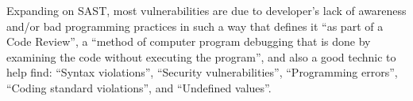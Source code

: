 



Expanding on SAST, most vulnerabilities are due to developer's lack of awareness and/or bad programming practices \cite{SAST_opensource} in such a way that \citeauthor{owasp-devsecops-sast} \cite{owasp-devsecops-sast} defines it ``as part of a Code Review'', a ``method of computer program debugging that is done by examining the code without executing the program'', and also a good technic to help find: ``Syntax violations'', ``Security vulnerabilities'', ``Programming errors'', ``Coding standard violations'', and ``Undefined values''.

